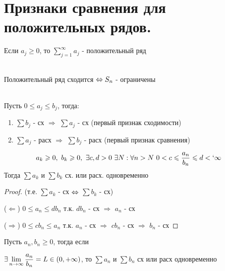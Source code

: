 \documentclass[matan]{subfiles}
\begin{document}
  \newpage
  \section{Признаки сравнения для положительных рядов.}

  \begin{definition}
      Если $a_j \geqslant 0$, то $\sum\limits_{j=1}^\infty a_j$ - положительный ряд
  \end{definition}

  \begin{theorem}\ \\
      Положительный ряд сходится $\Leftrightarrow S_n$ - ограничены
  \end{theorem}

  \begin{consequence} \ \\
      Пусть $0 \leqslant a_j \leqslant b_j$, тогда:
      \begin{enumerate}
          \item $\sum b_j$ - сх $\Rightarrow$ $\sum a_j$ - сх (первый признак сходимости)
          \item $\sum a_j$ - расх $\Rightarrow$ $\sum b_j$ - расх (первый признак сравнения)
      \end{enumerate}
  \end{consequence}

  \begin{Consequence}
      \[a_k \geqslant 0,\ b_k \geqslant 0,\ \exists c,d > 0\ \exists N: \forall n > N\ 0 < c \leqslant \frac{a_n}{b_n} \leqslant d <` \infty\]
      Тогда $\sum a_k$ и $\sum b_k$ сх. или расх. одновременно
  \end{Consequence}

  \begin{proof}
      (т.е. $\sum a_k$ - сх $\Leftrightarrow$ $\sum b_k$ - сх)

      ($\Leftarrow$) $0 \leqslant a_n \leqslant d b_n$ т.к. $d b_n$ - сх $\Rightarrow$ $a_n$ - сх

      ($\Rightarrow$) $0 \leqslant c b_n \leqslant a_n$ т.к. $a_n$ - сх $\Rightarrow$ $c b_n$ - сх $\Rightarrow$ $b_n$ - сх
  \end{proof}

  \begin{consequence} 
      Пусть $a_n, b_n \geqslant 0$, тогда если

      $\exists \lim\limits_{n \rightarrow \infty} \dfrac{a_n}{b_n} = L \in (0, + \infty)$, то $\sum a_n$ и $\sum b_n$ сх или расх одновременно
  \end{consequence}
\end{document}
